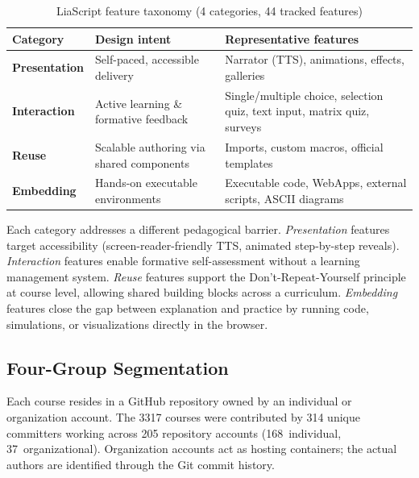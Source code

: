 \begin{table}[ht]
  \centering
  \caption{LiaScript feature taxonomy (4 categories, 44 tracked features)}
  \label{tab:taxonomy}
  \begin{tabular}{p{2.0cm}p{3.8cm}p{5.6cm}}
    \toprule
    \textbf{Category} & \textbf{Design intent} & \textbf{Representative features} \\
    \midrule
    \textcolor{catPresentation}{\textbf{Presentation}} &
      Self-paced, accessible delivery &
      Narrator (TTS), animations, effects, galleries \\[4pt]
    \textcolor{catInteraction}{\textbf{Interaction}} &
      Active learning \& formative feedback &
      Single/multiple choice, selection quiz, text input, matrix quiz, surveys \\[4pt]
    \textcolor{catReuse}{\textbf{Reuse}} &
      Scalable authoring via shared components &
      Imports, custom macros, official templates \\[4pt]
    \textcolor{catEmbedding}{\textbf{Embedding}} &
      Hands-on executable environments &
      Executable code, WebApps, external scripts, ASCII diagrams \\
    \bottomrule
  \end{tabular}
\end{table}

Each category addresses a different pedagogical barrier.
\emph{Presentation} features target accessibility (screen-reader-friendly TTS,
animated step-by-step reveals).
\emph{Interaction} features enable formative self-assessment without a learning
management system.
\emph{Reuse} features support the Don't-Repeat-Yourself principle at course level,
allowing shared building blocks across a curriculum.
\emph{Embedding} features close the gap between explanation and practice by
running code, simulations, or visualizations directly in the browser.

\subsection{Four-Group Segmentation}
\label{sec:four_groups}

Each course resides in a GitHub repository owned by an individual or
organization account.
The \num{3317} courses were contributed by \num{314} unique committers
working across \num{205} repository accounts (\num{168}~individual,
\num{37}~organizational).
Organization accounts act as hosting containers; the actual authors are
identified through the Git commit history.

